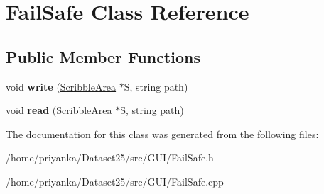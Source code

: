 \hypertarget{classFailSafe}{\section{\-Fail\-Safe \-Class \-Reference}
\label{classFailSafe}
}
\subsection*{\-Public \-Member \-Functions}
\begin{DoxyCompactItemize}
\item 
\hypertarget{classFailSafe_a65aa0426223354574ed4409f139d926c}{void {\bfseries write} (\hyperlink{classScribbleArea}{\-Scribble\-Area} $\ast$\-S, string path)}\label{classFailSafe_a65aa0426223354574ed4409f139d926c}

\item 
\hypertarget{classFailSafe_afe553de2abd707c6229f73bf3a798de7}{void {\bfseries read} (\hyperlink{classScribbleArea}{\-Scribble\-Area} $\ast$\-S, string path)}\label{classFailSafe_afe553de2abd707c6229f73bf3a798de7}

\end{DoxyCompactItemize}


\-The documentation for this class was generated from the following files\-:\begin{DoxyCompactItemize}
\item 
/home/priyanka/\-Dataset25/src/\-G\-U\-I/\-Fail\-Safe.\-h\item 
/home/priyanka/\-Dataset25/src/\-G\-U\-I/\-Fail\-Safe.\-cpp\end{DoxyCompactItemize}
